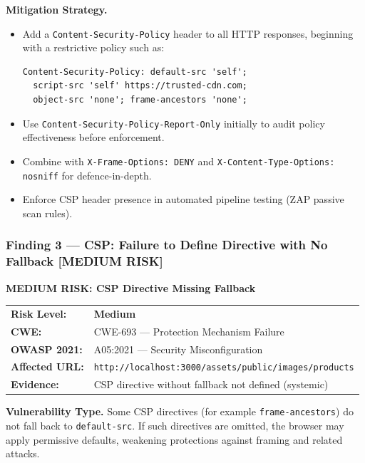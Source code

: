 \documentclass[12pt,a4paper]{article}
\newenvironment{secbox}[1]{%
  \begin{framed}
  \noindent\textbf{\color{phaseblue}#1}\par\medskip
}{%
  \end{framed}
}
\begin{document}
\textbf{Mitigation Strategy.}
\begin{itemize}
  \item Add a \texttt{Content-Security-Policy} header to all HTTP responses, beginning
    with a restrictive policy such as:
\begin{lstlisting}
Content-Security-Policy: default-src 'self';
  script-src 'self' https://trusted-cdn.com;
  object-src 'none'; frame-ancestors 'none';
\end{lstlisting}
  \item Use \texttt{Content-Security-Policy-Report-Only} initially to audit policy
    effectiveness before enforcement.
  \item Combine with \texttt{X-Frame-Options: DENY} and
    \texttt{X-Content-Type-Options: nosniff} for defence-in-depth.
  \item Enforce CSP header presence in automated pipeline testing (ZAP passive scan rules).
\end{itemize}


\subsubsection*{Finding 3 --- CSP: Failure to Define Directive with No Fallback [MEDIUM RISK]}

\begin{secbox}{\textcolor{medorange}{\textbf{MEDIUM RISK:}} CSP Directive Missing Fallback}
\begin{tabular}{@{}ll@{}}
\textbf{Risk Level:}   & \textcolor{medorange}{\textbf{Medium}} \\
\textbf{CWE:}          & CWE-693 --- Protection Mechanism Failure \\
\textbf{OWASP 2021:}   & A05:2021 --- Security Misconfiguration \\
\textbf{Affected URL:} & \texttt{http://localhost:3000/assets/public/images/products} \\
\textbf{Evidence:}     & CSP directive without fallback not defined (systemic) \\
\end{tabular}
\end{secbox}

\textbf{Vulnerability Type.}
Some CSP directives (for example \texttt{frame-ancestors}) do not fall back to
\texttt{default-src}. If such directives are omitted, the browser may apply permissive
defaults, weakening protections against framing and related attacks.
\end{document}
